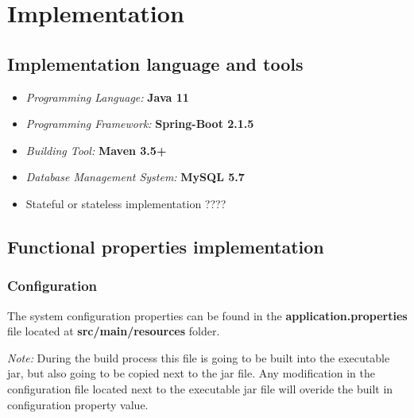 \documentclass[a4paper]{arrowhead}
\begin{document}
\newpage

\section{Implementation}
\label{Implementation}

\subsection {Implementation language and tools}


\begin{itemize}
\item \emph{Programming Language:} \textbf{Java 11}
\item \emph{Programming Framework:} \textbf{Spring-Boot 2.1.5}
\item \emph{Building Tool:} \textbf{Maven 3.5+}
\item \emph{Database Management System:} \textbf{MySQL 5.7}
\color{red}
\item Stateful or stateless implementation ???? 
\end{itemize} 
\color{black}

\subsection {Functional properties implementation}

\subsubsection{Configuration}
The system configuration properties can be found in the \textbf{application.properties} file located at \textbf{src/main/resources} folder.

\textit{Note:} During the build process this file is going to be built into the executable jar, but also going to be copied next to the jar file. Any modification in the configuration file located next to the executable jar file will overide the built in configuration property value.
\end{document}
